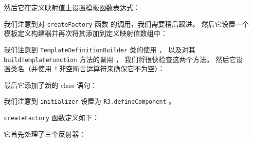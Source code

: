 


然后它在定义映射值上设置模板函数表达式：




我们注意到对 \texttt{createFactory} 函数  的调用，我们需要稍后跟进。
然后它设置一个模板定义构建器并再次将其添加到定义映射值数组中：




我们注意到 \texttt{TemplateDefinitionBuilder} 类的使用 ，
以及对其 \texttt{buildTemplateFunction} 方法的调用 ，
我们将很快检查这两个方法。
然后它设置类名（并使用\, ! 非空断言运算符来确保它不为空）：




最后它添加了新的 class 语句：




我们注意到 \texttt{initializer} 设置为 \texttt{R3.defineComponent} 。


\texttt{createFactory} 函数定义如下：




它首先处理了三个反射器：



